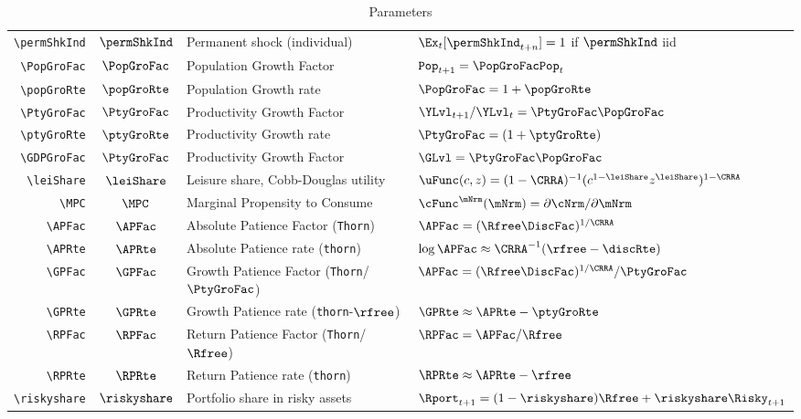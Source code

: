 \documentclass{econark}
\begin{document}
\begin{table}[ht]
\begin{tabular}{|>{\ttfamily}rcll|}
    \\ \verb|\permShkInd|  & $\permShkInd$ & Permanent shock (individual) & $\Ex_{t}[\permShkInd_{t+n}]=1$ if $\permShkInd$ iid
    \\ \verb|\PopGroFac|      & $\PopGroFac$ & Population Growth Factor & $\mathtt{Pop}_{t+1} = \PopGroFac \mathtt{Pop}_{t}$
    \\ \verb|\popGroRte|      & $\popGroRte$ & Population Growth rate & $\PopGroFac = 1 + \popGroRte$
    \\ \verb|\PtyGroFac|      & $\PtyGroFac$ & Productivity Growth Factor & $\YLvl_{t+1}/\YLvl_{t} = \PtyGroFac \PopGroFac$
    \\ \verb|\ptyGroRte|      & $\ptyGroRte$ & Productivity Growth rate & $\PtyGroFac = (1+\ptyGroRte)$
    \\ \verb|\GDPGroFac|      & $\PtyGroFac$ & Productivity Growth Factor & $\GLvl = \PtyGroFac \PopGroFac$
    \\ \verb|\leiShare|    & $\leiShare$ & Leisure share, Cobb-Douglas utility & $\uFunc(c,z)=(1-\CRRA)^{-1}(c^{1-\leiShare}z^{\leiShare})^{1-\CRRA}$
    \\ \verb|\MPC|         & $\MPC$ & Marginal Propensity to Consume & $\cFunc^{\mNrm}(\mNrm)=\partial \cNrm/\partial \mNrm$
    \\ \verb|\APFac|       & $\APFac$ & Absolute Patience Factor (\texttt{Thorn}) & $\APFac = (\Rfree \DiscFac)^{1/\CRRA} $
    \\ \verb|\APRte|       & $\APRte$ & Absolute Patience rate (\texttt{thorn}) & $\log \APFac \approx \CRRA^{-1}(\rfree-\discRte) $
    \\ \verb|\GPFac|       & $\GPFac$ & Growth Patience Factor (\texttt{Thorn}/{$\PtyGroFac$}) & $\APFac = (\Rfree \DiscFac)^{1/\CRRA}/\PtyGroFac$
    \\ \verb|\GPRte|       & $\GPRte$ & Growth Patience rate (\texttt{thorn}-$\rfree$) & $\GPRte \approx \APRte -\ptyGroRte $
    \\ \verb|\RPFac|       & $\RPFac$ & Return Patience Factor (\texttt{Thorn}/$\Rfree$) & $\RPFac = \APFac/\Rfree $
    \\ \verb|\RPRte|        & $\RPRte$ & Return Patience rate (\texttt{thorn}) & $\RPRte \approx \APRte -\rfree $
    \\ \verb|\riskyshare|  & $\riskyshare$ & Portfolio share in risky assets & $\Rport_{t+1}=(1-\riskyshare)\Rfree+\riskyshare\Risky_{t+1}$
    \\	\hline
  \end{tabular}
  \caption{Parameters}
  \label{table:Parameters}
\end{table}
\end{document}
